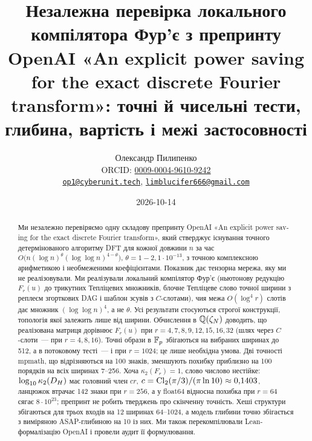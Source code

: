 \documentclass[11pt]{article}
\theoremstyle{plain}
\newcommand{\en}[1]{\foreignlanguage{english}{#1}}
\begin{document}
\renewcommand{\crefpairconjunction}{ і }
\renewcommand{\crefmiddleconjunction}{, }
\renewcommand{\creflastconjunction}{ і }
\renewcommand{\crefpairgroupconjunction}{ і }
\renewcommand{\crefmiddlegroupconjunction}{, }
\renewcommand{\creflastgroupconjunction}{ і }
\renewcommand{\crefrangeconjunction}{--}

\title{Незалежна перевірка локального компілятора Фур'є з препринту OpenAI
«\en{An explicit power saving for the exact discrete Fourier transform}»:
точні й чисельні тести, глибина, вартість і межі застосовності}
\author{Олександр Пилипенко\\[2pt]\small ORCID: \href{https://orcid.org/0009-0004-9610-9242}{0009-0004-9610-9242}\\ \href{mailto:op1@cyberunit.tech}{\texttt{op1@cyberunit.tech}}, \href{mailto:limblucifer666@gmail.com}{\texttt{limblucifer666@gmail.com}}}
\date{2026-10-14}
\maketitle

\begin{abstract}
\noindent
Ми незалежно перевіряємо одну складову препринту OpenAI «\en{An explicit power saving for the exact discrete Fourier transform}», який стверджує існування точного детермінованого алгоритму DFT для кожної довжини $n$ за час $O\bigl(n(\log n)^{\theta}(\log\log n)^{4-\theta}\bigr)$, $\theta=1-2{,}1\cdot10^{-13}$, з точною комплексною арифметикою і необмеженими коефіцієнтами. Показник дає тензорна мережа, яку ми не реалізовували. Ми реалізували локальний компілятор Фур'є (ньютонову редукцію $F_r(u)$ до трикутних Тепліцевих множників, блочне Тепліцеве слово точної ширини з реплеєм згорткових DAG і шаблон зсувів з $C$-слотами), чия межа $O(\log^4 r)$ слотів дає множник $(\log\log n)^4$, а не $\theta$. Усі результати стосуються строгої конструкції, топологія якої залежить лише від ширини. Обчислення в $\mathbb{Q}(\zeta_N)$ доводить, що реалізована матриця дорівнює $F_r(u)$ при $r=4,7,8,9,12,15,16,32$ (шлях через $C$-слоти~--- при $r=4,8,16$). Точні образи в $\mathbb{F}_p$ збігаються на вибраних ширинах до 512, а в потоковому тесті~--- і при $r=1024$; це лише необхідна умова. Дві точності mpmath, що відрізняються на 100 знаків, зменшують похибку приблизно на 100 порядків на всіх ширинах 7--256. Хоча $\kappa_2(F_r)=1$, слово числово нестійке: $\log_{10}\kappa_2(D_H)$ має головний член $cr$, $c=\operatorname{Cl}_2(\pi/3)/(\pi\ln10)\approx0{,}1403$, ланцюжок втрачає 142 знаки при $r=256$, а у float64 відносна похибка при $r=64$ сягає $8\cdot10^{23}$; препринт не робить тверджень про скінченну точність. Хеші структури збігаються для трьох входів на 12 ширинах 64--1024, а модель глибини точно збігається з виміряною ASAP-глибиною на 10 із них. Ми також перекомпілювали Lean-формалізацію OpenAI і провели аудит її формулювання.
\end{abstract}
\end{document}
